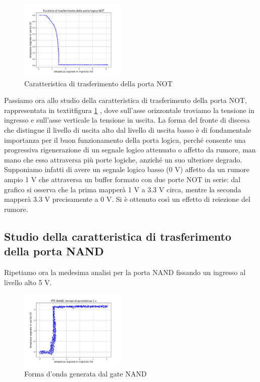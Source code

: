 \documentclass[journal]{IEEEtran}
\begin{document}
\begin{figure}[H]%
\begin{center}
\includegraphics[width=0.45\textwidth]{analysis/output/inverter_ring_xy.pdf}
\caption{Caratteristica di trasferimento della porta NOT}
\label{fig:transf_not}
\end{center}
\end{figure}

Passiamo ora allo studio della caratteristica di trasferimento della porta NOT, rappresentata in textit{figura \ref{fig:transf_not}}
, dove sull'asse orizzontale troviamo la tensione in ingresso e sull'asse verticale la tensione in uscita. La forma del fronte di discesa che distingue il livello di uscita alto dal livello di uscita basso è di fondamentale importanza per il buon funzionamento della porta logica, perché consente una progressiva rigenerazione di un segnale logico attenuato o affetto da rumore, man mano che esso attraversa più porte logiche, anziché un suo ulteriore degrado. Supponiamo infatti di avere un segnale logico basso (0 V) affetto da un rumore ampio 1 V che attraversa un buffer formato con due porte NOT in serie: dal grafico si osserva che la prima mapperà 1 V a 3.3 V circa, mentre la seconda mapperà 3.3 V precisamente a 0 V. Si è ottenuto così un effetto di reiezione del rumore.




\subsection{Studio della caratteristica di trasferimento della porta NAND}
Ripetiamo ora la medesima analisi per la porta NAND fissando un ingresso al livello alto 5 V.

\begin{figure}[H]%
\begin{center}
\includegraphics[width=0.45\textwidth]{analysis/output/NAND-XY.pdf}
\caption{Forma d'onda generata dal gate NAND}
\label{fig:graph_ring_oscillator}
\end{center}
\end{figure}
\end{document}
